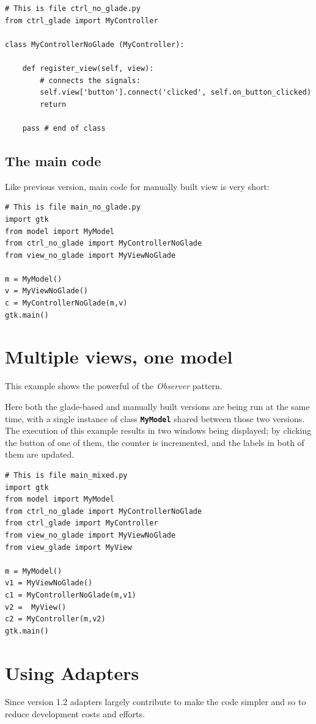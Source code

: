\documentclass{article}
\newcommand{\kw}[1]{\emph{#1}\xspace}
\newcommand{\obs}{\kw{Observer} pattern\xspace}
\newcommand{\codename}[1]{\texttt{\bfseries \textcolor {codecolor}{#1}}\xspace}
\newcommand{\codesize}{\small } %
\begin{document}
{ \codesize 
\begin{verbatim}   
# This is file ctrl_no_glade.py
from ctrl_glade import MyController

class MyControllerNoGlade (MyController):

    def register_view(self, view):
        # connects the signals:
        self.view['button'].connect('clicked', self.on_button_clicked)
        return    
    
    pass # end of class
\end{verbatim}
} 


\subsection{The main code}
Like previous version, main code for manually built view is very
short:

{ \codesize 
\begin{verbatim}     
# This is file main_no_glade.py
import gtk
from model import MyModel
from ctrl_no_glade import MyControllerNoGlade
from view_no_glade import MyViewNoGlade

m = MyModel()
v = MyViewNoGlade()
c = MyControllerNoGlade(m,v)
gtk.main()
\end{verbatim}
} 

\section{Multiple views, one model}
This example shows the powerful of the \obs.

Here both the glade-based and manually built versions are being run at
the same time, with a single instance of class \codename{MyModel}
shared between those two versions. The execution of this example
results in two windows being displayed; by clicking the button of one
of them, the counter is incremented, and the labels in both of them
are updated.

{ \codesize 
\begin{verbatim}       
# This is file main_mixed.py
import gtk
from model import MyModel
from ctrl_no_glade import MyControllerNoGlade
from ctrl_glade import MyController
from view_no_glade import MyViewNoGlade
from view_glade import MyView

m = MyModel()
v1 = MyViewNoGlade()
c1 = MyControllerNoGlade(m,v1)
v2 =  MyView()
c2 = MyController(m,v2)
gtk.main()
\end{verbatim}
}


\section{Using Adapters}
Since version 1.2 adapters largely contribute to make the code
simpler and so to reduce development costs and efforts.
\end{document}
